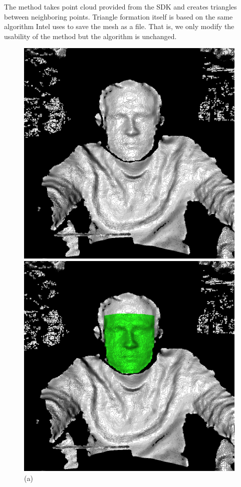 The method takes point cloud provided from the SDK and creates triangles between neighboring points. Triangle formation itself is based on the same algorithm Intel uses to save the mesh as a file. That is, we only modify the usability of the method but the algorithm is unchanged. 

\begin{figure}
  \centering
  \begin{minipage}{.32\textwidth}
    \centering
    \includegraphics[width=0.99\textwidth]{Figures/Pictures/full_pc.png}
    \caption*{(a)}
  \end{minipage}
  \begin{minipage}{.32\textwidth}
    \centering
    \includegraphics[width=0.99\textwidth]{Figures/Pictures/full_with_overlay.png}

\end{minipage}
\end{figure}
